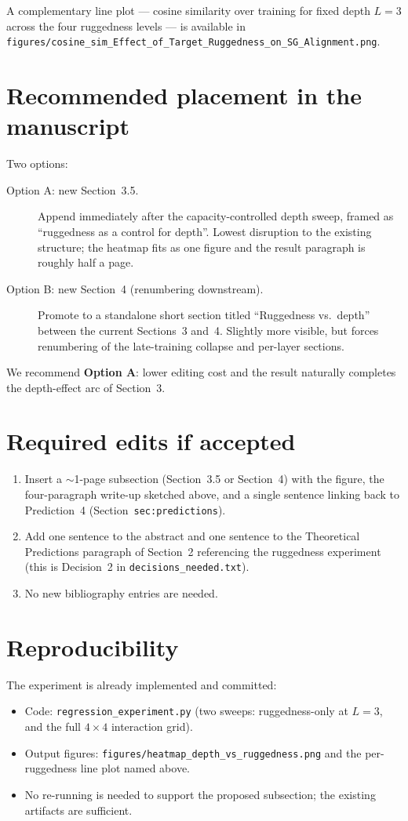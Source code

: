 \documentclass[11pt]{article}
\begin{document}
A complementary line plot --- cosine similarity over training for fixed
depth $L=3$ across the four ruggedness levels --- is available in
\texttt{figures/cosine\_sim\_Effect\_of\_Target\_Ruggedness\_on\_SG\_Alignment.png}.

\section{Recommended placement in the manuscript}
Two options:
\begin{description}
\item[Option A: new Section~3.5.] Append immediately after the
  capacity-controlled depth sweep, framed as ``ruggedness as a control
  for depth''. Lowest disruption to the existing structure; the heatmap
  fits as one figure and the result paragraph is roughly half a page.
\item[Option B: new Section~4 (renumbering downstream).] Promote to a
  standalone short section titled ``Ruggedness vs.~depth'' between the
  current Sections~3 and~4. Slightly more visible, but forces
  renumbering of the late-training collapse and per-layer sections.
\end{description}
We recommend \textbf{Option A}: lower editing cost and the result
naturally completes the depth-effect arc of Section~3.

\section{Required edits if accepted}
\begin{enumerate}
  \item Insert a $\sim$1-page subsection (Section~3.5 or Section~4) with
        the figure, the four-paragraph write-up sketched above, and a
        single sentence linking back to Prediction~4
        (Section~\texttt{sec:predictions}).
  \item Add one sentence to the abstract and one sentence to the
        Theoretical Predictions paragraph of Section~2 referencing the
        ruggedness experiment (this is Decision~2 in
        \texttt{decisions\_needed.txt}).
  \item No new bibliography entries are needed.
\end{enumerate}

\section{Reproducibility}
The experiment is already implemented and committed:
\begin{itemize}
  \item Code: \texttt{regression\_experiment.py} (two sweeps:
    ruggedness-only at $L=3$, and the full $4\times4$ interaction grid).
  \item Output figures: \texttt{figures/heatmap\_depth\_vs\_ruggedness.png}
    and the per-ruggedness line plot named above.
  \item No re-running is needed to support the proposed subsection;
    the existing artifacts are sufficient.
\end{itemize}
\end{document}
